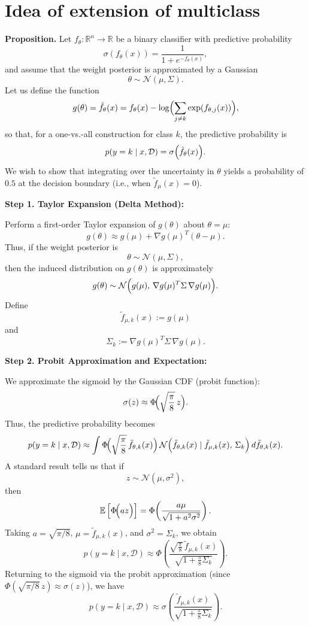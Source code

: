 \documentclass{article}
\begin{document}
\section*{Idea of extension of multiclass}

\textbf{Proposition.} Let $f_\theta: \mathbb{R}^n \to \mathbb{R}$ be a binary classifier with predictive probability
\[
\sigma(f_\theta(x)) = \frac{1}{1+e^{-f_\theta(x)}},
\]
and assume that the weight posterior is approximated by a Gaussian
\[
\theta \sim \mathcal{N}(\mu,\Sigma).
\]
Let us define the function
\[
g(\theta) = \tilde{f}_\theta(x) = f_\theta(x) - \log\Bigl(\sum_{j\neq k}\exp(f_{\theta,j}(x))\Bigr),
\]
so that, for a one-vs.-all construction for class $k$, the predictive probability is
\[
p(y=k \mid x,\mathcal{D}) = \sigma\Bigl(\tilde{f}_\theta(x)\Bigr).
\]
We wish to show that integrating over the uncertainty in $\theta$ yields a probability of $0.5$ at the decision boundary (i.e., when $\tilde{f}_\mu(x)=0$).

\vspace{1ex}
\textbf{Step 1. Taylor Expansion (Delta Method):}

Perform a first-order Taylor expansion of $g(\theta)$ about $\theta = \mu$:
\[
g(\theta) \approx g(\mu) + \nabla g(\mu)^T (\theta-\mu).
\]
Thus, if the weight posterior is
\[
\theta \sim \mathcal{N}(\mu,\Sigma),
\]
then the induced distribution on $g(\theta)$ is approximately
\[
g(\theta) \sim \mathcal{N}\Bigl(g(\mu),\, \nabla g(\mu)^T \Sigma \, \nabla g(\mu)\Bigr).
\]
Define
\[
\tilde{f}_{\mu,k}(x) := g(\mu)
\]
and
\[
\Sigma_k := \nabla g(\mu)^T \Sigma \, \nabla g(\mu).
\]

\vspace{1ex}
\textbf{Step 2. Probit Approximation and Expectation:}

We approximate the sigmoid by the Gaussian CDF (probit function):
\[
\sigma(z) \approx \Phi\!\Bigl(\sqrt{\frac{\pi}{8}}\,z\Bigr).
\]
Thus, the predictive probability becomes
\[
p(y=k \mid x,\mathcal{D}) \approx \int \Phi\!\Bigl(\sqrt{\frac{\pi}{8}}\, \tilde{f}_{\theta,k}(x)\Bigr)\, \mathcal{N}\Bigl(\tilde{f}_{\theta,k}(x) \mid \tilde{f}_{\mu,k}(x),\, \Sigma_k\Bigr)\, d\tilde{f}_{\theta,k}(x).
\]
A standard result tells us that if
\[
z \sim \mathcal{N}(\mu, \sigma^2),
\]
then
\[
\mathbb{E}\left[\Phi\!\Bigl(a z\Bigr)\right] = \Phi\!\left(\frac{a\mu}{\sqrt{1+a^2\sigma^2}}\right).
\]
Taking $a=\sqrt{\pi/8}$, $\mu=\tilde{f}_{\mu,k}(x)$, and $\sigma^2=\Sigma_k$, we obtain
\[
p(y=k \mid x,\mathcal{D}) \approx \Phi\!\left(\frac{\sqrt{\frac{\pi}{8}}\,\tilde{f}_{\mu,k}(x)}{\sqrt{1+\frac{\pi}{8}\Sigma_k}}\right).
\]
Returning to the sigmoid via the probit approximation (since $\Phi(\sqrt{\pi/8}\,z) \approx \sigma(z)$), we have
\[
p(y=k \mid x,\mathcal{D}) \approx \sigma\!\left(\frac{\tilde{f}_{\mu,k}(x)}{\sqrt{1+\frac{\pi}{8}\Sigma_k}}\right).
\]
\end{document}
